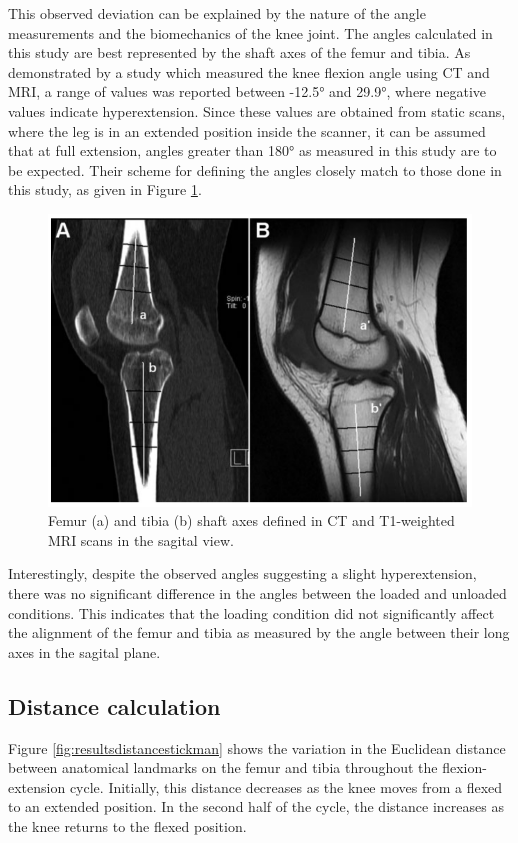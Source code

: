 \documentclass{micro-econ-thesis}
\begin{document}
This observed deviation can be explained by the nature of the angle measurements and the biomechanics of the knee joint. The angles calculated in this study are best represented by the shaft axes of the femur and tibia. As demonstrated by a study \parencite{dai_comparing_2021} which measured the knee flexion angle using CT and MRI, a range of values was reported between -12.5° and 29.9°, where negative values indicate hyperextension. Since these values are obtained from static scans, where the leg is in an extended position inside the scanner, it can be assumed that at full extension, angles greater than 180° as measured in this study are to be expected. Their scheme for defining the angles closely match to those done in this study, as given in Figure \ref{fig:daiimage}. 

\begin{figure}[H]
	\centering
	\includegraphics[width=0.7\linewidth]{dai_image}
	\caption{Femur (a) and tibia (b) shaft axes defined in CT and T1-weighted MRI scans in the sagital view. \parencite{dai_comparing_2021}}
	\label{fig:daiimage}
\end{figure}

Interestingly, despite the observed angles suggesting a slight hyperextension, there was no significant difference in the angles between the loaded and unloaded conditions. This indicates that the loading condition did not significantly affect the alignment of the femur and tibia as measured by the angle between their long axes in the sagital plane. 



\subsection{Distance calculation}

Figure \ref{fig:resultsdistancestickman} shows the variation in the Euclidean distance between anatomical landmarks on the femur and tibia throughout the flexion-extension cycle. Initially, this distance decreases as the knee moves from a flexed to an extended position. In the second half of the cycle, the distance increases as the knee returns to the flexed position.
\end{document}
